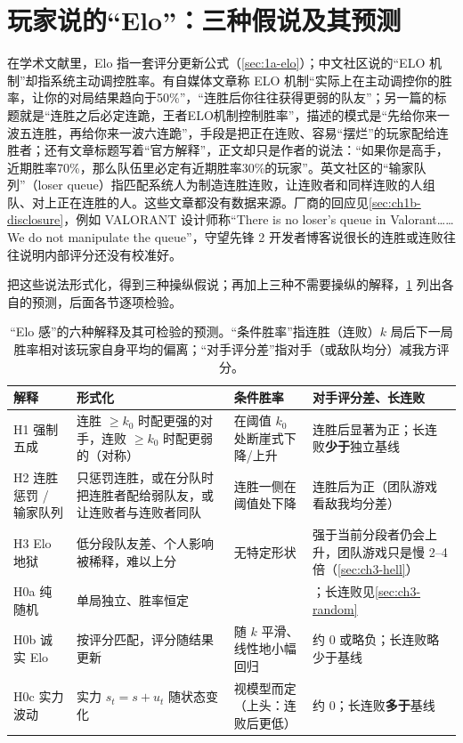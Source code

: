 \section{玩家说的“Elo”：三种假说及其预测}
\label{sec:ch3-hyp}

在学术文献里，Elo 指一套评分更新公式（\cref{sec:1a-elo}）；中文社区说的“ELO 机制”却指系统主动调控胜率。有自媒体文章称 ELO 机制“实际上在主动调控你的胜率，让你的对局结果趋向于50\%”，“连胜后你往往获得更弱的队友”\cite{sohu2026elo}\tagCom；另一篇的标题就是“连胜之后必定连跪，王者ELO机制控制胜率”，描述的模式是“先给你来一波五连胜，再给你来一波六连跪”，手段是把正在连败、容易“摆烂”的玩家配给连胜者\cite{xiaomi2022liansheng}\tagCom；还有文章标题写着“官方解释”，正文却只是作者的说法：“如果你是高手，近期胜率70\%，那么队伍里必定有近期胜率30\%的玩家”\cite{ghzs2022wangzhe}\tagCom。英文社区的“输家队列”（loser queue）指匹配系统人为制造连胜连败，让连败者和同样连败的人组队、对上正在连胜的人\cite{renecotyfanboy2023existence}\tagCom。这些文章都没有数据来源。厂商的回应见\cref{sec:ch1b-disclosure}，例如 VALORANT 设计师称“There is no loser's queue in Valorant……We do not manipulate the queue”\cite{koh2022valorant}\tagOff，守望先锋 2 开发者博客说很长的连胜或连败往往说明内部评分还没有校准好\cite{blizzard2023overwatch}\tagOff。

把这些说法形式化，得到三种操纵假说；再加上三种不需要操纵的解释，\cref{tab:ch3-hyp} 列出各自的预测，后面各节逐项检验。

\begin{table}[htbp]
\centering\footnotesize
\caption{“Elo 感”的六种解释及其可检验的预测。“条件胜率”指连胜（连败）$k$ 局后下一局胜率相对该玩家自身平均的偏离；“对手评分差”指对手（或敌队均分）减我方评分。}
\label{tab:ch3-hyp}
\begin{tabularx}{\linewidth}{>{\raggedright\arraybackslash}p{2.6cm}>{\raggedright\arraybackslash}X>{\raggedright\arraybackslash}X>{\raggedright\arraybackslash}p{2.6cm}}
\toprule
解释 & 形式化 & 条件胜率 & 对手评分差、长连败 \\
\midrule
H1 强制五成 & 连胜 $\ge k_0$ 时配更强的对手，连败 $\ge k_0$ 时配更弱的（对称） & 在阈值 $k_0$ 处断崖式下降/上升 & 连胜后显著为正；长连败\textbf{少于}独立基线 \\
H2 连胜惩罚 / 输家队列 & 只惩罚连胜，或在分队时把连胜者配给弱队友，或让连败者与连败者同队 & 连胜一侧在阈值处下降 & 连胜后为正（团队游戏看敌我均分差） \\
H3 Elo 地狱 & 低分段队友差、个人影响被稀释，难以上分 & 无特定形状 & 强于当前分段者仍会上升，团队游戏只是慢 2–4 倍（\cref{sec:ch3-hell}） \\
\midrule
H0a 纯随机 & 单局独立、胜率恒定 & 0 & 0；长连败见\cref{sec:ch3-random} \\
H0b 诚实 Elo & 按评分匹配，评分随结果更新 & 随 $k$ 平滑、线性地小幅回归 & 约 0 或略负；长连败略少于基线 \\
H0c 实力波动 & 实力 $s_t=s+u_t$ 随状态变化 & 视模型而定（上头：连败后更低） & 约 0；长连败\textbf{多于}基线 \\
\bottomrule
\end{tabularx}
\end{table}

